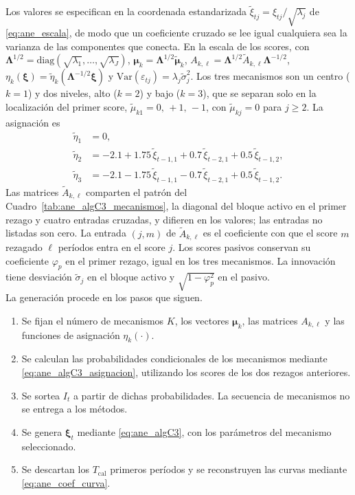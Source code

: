 Los valores se especifican en la coordenada estandarizada $\tilde{\xi}_{tj}=\xi_{tj}/\sqrt{\lambda_j}$ de \eqref{eq:ane_escala}, de modo que un coeficiente cruzado se lee igual cualquiera sea la varianza de las componentes que conecta. En la escala de los scores, con $\boldsymbol{\Lambda}^{1/2}=\mathrm{diag}(\sqrt{\lambda_1},\ldots,\sqrt{\lambda_J})$, $\boldsymbol{\mu}_k=\boldsymbol{\Lambda}^{1/2}\tilde{\boldsymbol{\mu}}_k$, $A_{k,\ell}=\boldsymbol{\Lambda}^{1/2}\tilde{A}_{k,\ell}\boldsymbol{\Lambda}^{-1/2}$, $\eta_k(\boldsymbol{\xi})=\tilde{\eta}_k(\boldsymbol{\Lambda}^{-1/2}\boldsymbol{\xi})$ y $\mathrm{Var}(\varepsilon_{tj})=\lambda_j\tilde\sigma_j^{2}$. Los tres mecanismos son un centro ($k=1$) y dos niveles, alto ($k=2$) y bajo ($k=3$), que se separan solo en la localización del primer score, $\tilde\mu_{k1}=0,\,+1,\,-1$, con $\tilde\mu_{kj}=0$ para $j\ge2$. La asignación es
\begin{align}
\tilde{\eta}_1 &= 0, \nonumber\\
\tilde{\eta}_2 &= -2.1 + 1.75\,\tilde{\xi}_{t-1,1} + 0.7\,\tilde{\xi}_{t-2,1} + 0.5\,\tilde{\xi}_{t-1,2}, \label{eq:ane_algC3_q}\\
\tilde{\eta}_3 &= -2.1 - 1.75\,\tilde{\xi}_{t-1,1} - 0.7\,\tilde{\xi}_{t-2,1} + 0.5\,\tilde{\xi}_{t-1,2}. \nonumber
\end{align}
Las matrices $\tilde A_{k,\ell}$ comparten el patrón del Cuadro~\ref{tab:ane_algC3_mecanismos}, la diagonal del bloque activo en el primer rezago y cuatro entradas cruzadas, y difieren en los valores; las entradas no listadas son cero. La entrada $(j,m)$ de $\tilde A_{k,\ell}$ es el coeficiente con que el score $m$ rezagado $\ell$ períodos entra en el score $j$. Los scores pasivos conservan su coeficiente $\varphi_p$ en el primer rezago, igual en los tres mecanismos. La innovación tiene desviación $\tilde\sigma_j$ en el bloque activo y $\sqrt{1-\varphi_p^{2}}$ en el pasivo.\\

La generación procede en los pasos que siguen.
\begin{enumerate}
    \item Se fijan el número de mecanismos $K$, los vectores $\boldsymbol{\mu}_k$, las matrices $A_{k,\ell}$ y las funciones de asignación $\eta_k(\cdot)$.

    \item Se calculan las probabilidades condicionales de los mecanismos mediante \eqref{eq:ane_algC3_asignacion}, utilizando los scores de los dos rezagos anteriores.

    \item Se sortea $I_t$ a partir de dichas probabilidades. La secuencia de mecanismos no se entrega a los métodos.

    \item Se genera $\boldsymbol{\xi}_t$ mediante \eqref{eq:ane_algC3}, con los parámetros del mecanismo seleccionado.

    \item Se descartan los $T_{\mathrm{cal}}$ primeros períodos y se reconstruyen las curvas mediante \eqref{eq:ane_coef_curva}.
\end{enumerate}

